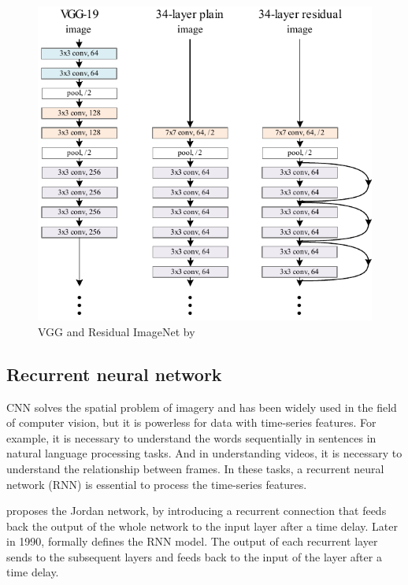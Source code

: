 \hspace{1em}
\begin{minipage}[ht]{.62\textwidth}
    \begin{figure}[H]
        \centering
    \includegraphics[width=.99\textwidth]{literature/imgs/ext-CNN-ResNet.pdf}
    \caption{VGG and Residual ImageNet by \citet{he2015deep}}
    \label{fig:ext-CNN-ResNet}
    \end{figure}
\end{minipage}

\subsection{Recurrent neural network} %
CNN solves the spatial problem of imagery and has been widely used in the field of computer vision, but it is powerless for data with time-series features.
For example, it is necessary to understand the words sequentially in sentences in natural language processing tasks.
And in understanding videos, it is necessary to understand the relationship between frames.
In these tasks, a recurrent neural network (RNN) is essential to process the time-series features.

\citet{jordan1986serial} proposes the Jordan network, by introducing a recurrent connection that feeds back the output of the whole network to the input layer after a time delay. 
Later in 1990, \citet{elman1990finding} formally defines the RNN model.
The output of each recurrent layer sends to the subsequent layers and feeds back to the input of the layer after a time delay.

